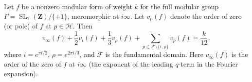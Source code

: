 Let $f$ be a nonzero modular form of weight $k$ for the full modular group $\Gamma = \operatorname{SL}_2(\mathbf{Z})/\{\pm 1\}$, meromorphic at $i\infty$. Let $v_p(f)$ denote the order of zero (or pole) of $f$ at $p \in \mathcal{H}$. Then
$$
v_\infty(f) + \frac{1}{2} v_i(f) + \frac{1}{3} v_\rho(f) + \sum_{p \in \mathcal{F} \setminus \{i,\rho\}} v_p(f) = \frac{k}{12},
$$
where $i = e^{\pi i/2}$, $\rho = e^{2\pi i/3}$, and $\mathcal{F}$ is the fundamental domain. Here $v_\infty(f)$ is the order of the zero of $f$ at $i\infty$ (the exponent of the leading $q$-term in the Fourier expansion).
